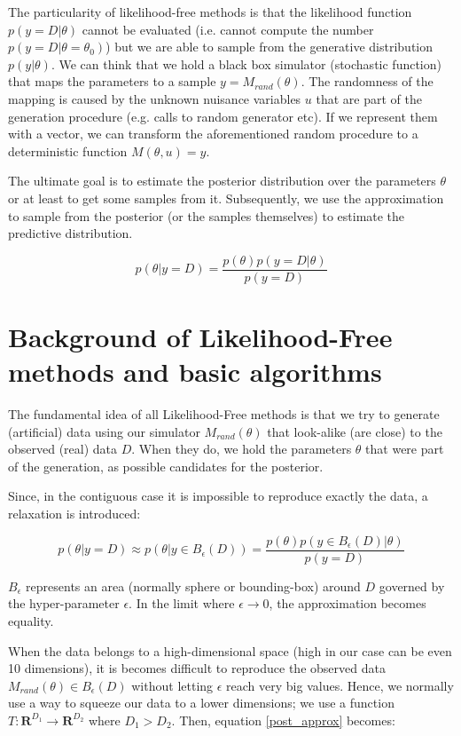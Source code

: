 \documentclass{article}
\begin{document}
The particularity of likelihood-free methods is that the likelihood function $p(y=D|\theta)$ cannot be evaluated (i.e. cannot compute the number $p(y=D|\theta=\theta_0)$) but we are able to sample from the generative distribution $p(y|\theta)$. We can think that we hold a black box simulator (stochastic function) that maps the parameters to a sample $y = M_{rand}(\theta)$. The randomness of the mapping is caused by the unknown nuisance variables $u$ that are part of the generation procedure (e.g. calls to random generator etc). If we represent them with a vector, we can transform the aforementioned random procedure to a deterministic function $M(\theta, u) = y$.  

The ultimate goal is to estimate the posterior distribution over the parameters $\theta$ or at least to get some samples from it. Subsequently, we use the approximation to sample from the posterior (or the samples themselves) to estimate the predictive distribution. 

\begin{equation}
    p(\theta|y=D) = \frac{p(\theta) p(y=D|\theta)}{p(y=D)}
\end{equation}


\section{Background of Likelihood-Free methods and basic algorithms}

The fundamental idea of all Likelihood-Free methods is that we try to generate (artificial) data using our simulator $M_{rand}(\theta)$ that look-alike (are close) to the observed (real) data $D$. When they do, we hold the parameters $\theta$ that were part of the generation, as possible candidates for the posterior.

Since, in the contiguous case it is impossible to reproduce exactly the data, a relaxation is introduced:

\begin{equation} \label{eq:post_approx}
    p(\theta|y=D) \approx p(\theta|y \in B_\epsilon(D)) = \frac{p(\theta) p(y \in B_\epsilon(D)|\theta)}{p(y=D)}
\end{equation}

$B_\epsilon$ represents an area (normally sphere or bounding-box) around $D$ governed by the hyper-parameter $\epsilon$. In the limit where $\epsilon \rightarrow 0$, the approximation becomes equality.

When the data belongs to a high-dimensional space (high in our case can be even 10 dimensions), it is becomes difficult to reproduce the observed data $M_{rand}(\theta) \in B_{\epsilon}(D)$ without letting $\epsilon$ reach very big values. Hence, we normally use a way to squeeze our data to a lower dimensions; we use a function $T:\mathbf{R}^{D_1} \rightarrow \mathbf{R}^{D_2}$ where $D_1 > D_2$. Then, equation \ref{post_approx} becomes:
\end{document}
